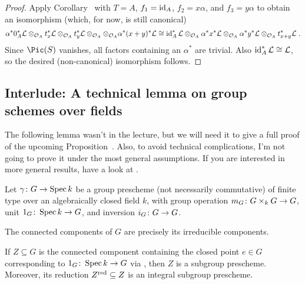 \documentclass[a4paper,parskip=half,numbers=enddot, DIV=12]{scrreprt}
\begin{document}
\begin{proof}
	Apply Corollary~ with $T=A$, $f_1=\operatorname{id}_A$, $f_2=x\alpha$, and $f_3=y\alpha$ to obtain an isomorphism (which, for now, is still canonical)
	\begin{align*}
		 \alpha^*0_A^*\mathcal{L}\otimes_{\mathcal{O}_A}t_x^*\mathcal{L}\otimes_{\mathcal{O}_A}t_y^*\mathcal{L}\otimes_{\mathcal{O}_A}\otimes_{\mathcal{O}_A}\alpha^*(x+y)^*\mathcal{L}\cong \operatorname{id}_A^*\mathcal{L}\otimes_{\mathcal{O}_A}\alpha^*x^*\mathcal{L}\otimes_{\mathcal{O}_A}\alpha^*y^*\mathcal{L}\otimes_{\mathcal{O}_A}t_{x+y}^*\mathcal{L}\;.
	\end{align*}
	Since $\Pic(S)$ vanishes, all factors containing an $\alpha^*$ are trivial. Also $\operatorname{id}_A^*\mathcal{L}\cong \mathcal{L}$, so the desired (non-canonical) isomorphism follows.
\end{proof}
\subsection{Interlude: A technical lemma on group schemes over fields}
The following lemma wasn't in the lecture, but we will need it to give a full proof of the upcoming Proposition~. Also, to avoid technical complications, I'm not going to prove it under the most general assumptions. If you are interested in more general results, have a look at \cite[]{stacks-project}.
\begin{lem}
	Let $\gamma\colon G\morphism\Spec k$ be a group prescheme (not necessarily commutative) of finite type over an algebraically closed field $k$, with group operation $m_G\colon G\times_kG\morphism G$, unit $1_G\colon \Spec k\morphism G$, and inversion $i_G\colon G\morphism G$.
	\begin{alphanumerate}
		\item The connected components of $G$ are precisely its irreducible components.
		\item If $Z\subseteq G$ is the connected component containing the closed point $e\in G$ corresponding to $1_G\colon \Spec k\morphism G$ via , then $Z$ is a subgroup prescheme. Moreover, its reduction $Z^{\mathrm{red}}\subseteq Z$ is an integral subgroup prescheme.
	\end{alphanumerate}
\end{lem}
\end{document}
